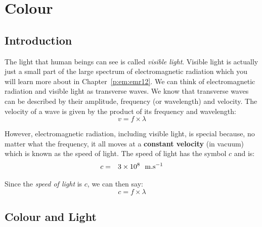 \chapter{Colour} 
\label{p:wsl:c12} 


\section{Introduction} 
The light that human beings can see is called \textit{visible light}. Visible light is actually just a small part of the large spectrum of electromagnetic radiation which you will learn more about in Chapter~\ref{p:em:emr12}. We can think of electromagnetic radiation and visible light as transverse waves. We know that transverse waves can be described by their amplitude, frequency (or wavelength) and velocity. The velocity of a wave is given by the product of its frequency and wavelength:
\begin{equation}
v = f \times \lambda
\end{equation}\label{eq:wavespeed} 

However, electromagnetic radiation, including visible light, is special because, no matter what the frequency, it all moves at a \textbf{constant velocity} (in vacuum) which is known as the speed of light. The speed of light has the symbol $c$ and is:
\begin{eqnarray*}
c &=& 3 \times 10^{8}~~\rm{m.s^{-1}}
\end{eqnarray*} 

Since the \textit{speed of light} is $c$, we can then say:
\begin{equation}
c = f \times \lambda
\end{equation}



\section{Colour and Light} 

